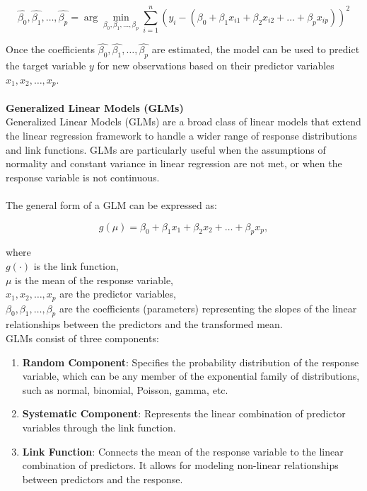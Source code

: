 \documentclass[12pt]{report}
\begin{document}
\begin{equation}
    \hat{\beta_0}, \hat{\beta_1}, \ldots, \hat{\beta_p} = \arg \min_{\beta_0, \beta_1, \ldots, \beta_p} \sum_{i=1}^{n} (y_i - (\beta_0 + \beta_1 x_{i1} + \beta_2 x_{i2} + \ldots + \beta_p x_{ip}))^2
\end{equation}

\noindent Once the coefficients \(\hat{\beta_0}, \hat{\beta_1}, \ldots, \hat{\beta_p}\) are estimated,
the model can be used to predict the target variable \(y\) for new observations based on
their predictor variables \(x_1, x_2, \ldots, x_p\).\\
\\
\textbf{Generalized Linear Models (GLMs)}\\
Generalized Linear Models (GLMs) are a broad class of linear models that extend the linear
regression framework to handle a wider range of response distributions and link functions.
GLMs are particularly useful when the assumptions of normality and constant variance in
linear regression are not met, or when the response variable is not continuous.\\
\\
The general form of a GLM can be expressed as:

\begin{equation}
    g(\mu) = \beta_0 + \beta_1 x_1 + \beta_2 x_2 + \ldots + \beta_p x_p,
\end{equation}

\noindent where\\
\( g(\cdot) \) is the link function,\\
\( \mu \) is the mean of the response variable,\\
\( x_1, x_2, \ldots, x_p \) are the predictor variables,\\
\( \beta_0, \beta_1, \ldots, \beta_p \) are the coefficients (parameters) representing the slopes of the linear relationships between the predictors and the transformed mean.\\

\noindent GLMs consist of three components: 
\begin{enumerate}
    \item \textbf{Random Component}: Specifies the probability distribution of the response variable, which can be any member of the exponential family of distributions, such as normal, binomial, Poisson, gamma, etc.
    \item \textbf{Systematic Component}: Represents the linear combination of predictor variables through the link function.
    \item \textbf{Link Function}: Connects the mean of the response variable to the linear combination of predictors. It allows for modeling non-linear relationships between predictors and the response.
\end{enumerate}
\end{document}
